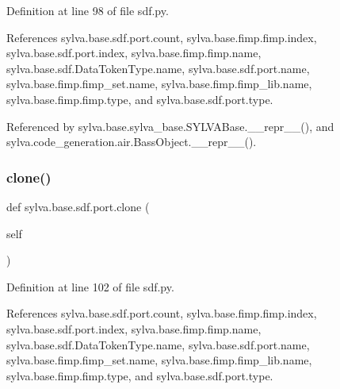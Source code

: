 Definition at line 98 of file sdf.\+py.



References sylva.\+base.\+sdf.\+port.\+count, sylva.\+base.\+fimp.\+fimp.\+index, sylva.\+base.\+sdf.\+port.\+index, sylva.\+base.\+fimp.\+fimp.\+name, sylva.\+base.\+sdf.\+Data\+Token\+Type.\+name, sylva.\+base.\+sdf.\+port.\+name, sylva.\+base.\+fimp.\+fimp\+\_\+set.\+name, sylva.\+base.\+fimp.\+fimp\+\_\+lib.\+name, sylva.\+base.\+fimp.\+fimp.\+type, and sylva.\+base.\+sdf.\+port.\+type.



Referenced by sylva.\+base.\+sylva\+\_\+base.\+S\+Y\+L\+V\+A\+Base.\+\_\+\+\_\+repr\+\_\+\+\_\+(), and sylva.\+code\+\_\+generation.\+air.\+Bass\+Object.\+\_\+\+\_\+repr\+\_\+\+\_\+().


\mbox{\label{classsylva_1_1base_1_1sdf_1_1port_ae5c6adc9c86e717d12901d73699bb432}} 
\subsubsection{\texorpdfstring{clone()}{clone()}}
{\footnotesize\ttfamily def sylva.\+base.\+sdf.\+port.\+clone (\begin{DoxyParamCaption}\item[{}]{self }\end{DoxyParamCaption})}



Definition at line 102 of file sdf.\+py.



References sylva.\+base.\+sdf.\+port.\+count, sylva.\+base.\+fimp.\+fimp.\+index, sylva.\+base.\+sdf.\+port.\+index, sylva.\+base.\+fimp.\+fimp.\+name, sylva.\+base.\+sdf.\+Data\+Token\+Type.\+name, sylva.\+base.\+sdf.\+port.\+name, sylva.\+base.\+fimp.\+fimp\+\_\+set.\+name, sylva.\+base.\+fimp.\+fimp\+\_\+lib.\+name, sylva.\+base.\+fimp.\+fimp.\+type, and sylva.\+base.\+sdf.\+port.\+type.


